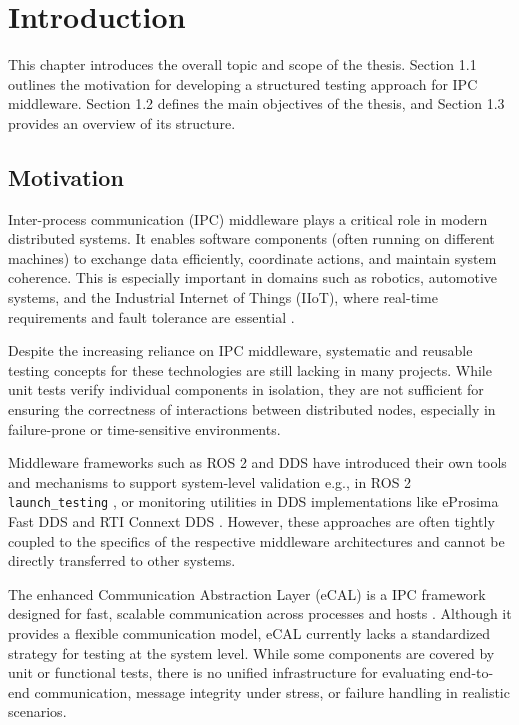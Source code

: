 \clearpage

\section{Introduction}

This chapter introduces the overall topic and scope of the thesis. Section 1.1 outlines the motivation for developing a structured testing approach for IPC  middleware. Section 1.2 defines the main objectives of the thesis, and Section 1.3 provides an overview of its structure.

\subsection{Motivation}

Inter-process communication (IPC) middleware plays a critical role in modern distributed systems. It enables software components (often running on different machines) to exchange data efficiently, coordinate actions, and maintain system coherence. This is especially important in domains such as robotics, automotive systems, and the Industrial Internet of Things (IIoT), where real-time requirements and fault tolerance are essential \cite{coulouris2012}.

\vspace{1em}
Despite the increasing reliance on IPC middleware, systematic and reusable testing concepts for these technologies are still lacking in many projects. While unit tests verify individual components in isolation, they are not sufficient for ensuring the correctness of interactions between distributed nodes, especially in failure-prone or time-sensitive environments.

\vspace{1em}
Middleware frameworks such as ROS 2 and DDS have introduced their own tools and mechanisms to support system-level validation e.g., in ROS 2  \texttt{launch\_testing} \cite{ros2_launch_testing}, or monitoring utilities in DDS implementations like eProsima Fast DDS and RTI Connext DDS \cite{eprosima_fast_dds, rti_connext_dds}. However, these approaches are often tightly coupled to the specifics of the respective middleware architectures and cannot be directly transferred to other systems.

\vspace{1em}
The enhanced Communication Abstraction Layer (eCAL) is a IPC framework designed for fast, scalable communication across processes and hosts \cite{ecal_github}. Although it provides a flexible communication model, eCAL currently lacks a standardized strategy for testing at the system level. While some components are covered by unit or functional tests, there is no unified infrastructure for evaluating end-to-end communication, message integrity under stress, or failure handling in realistic scenarios.

